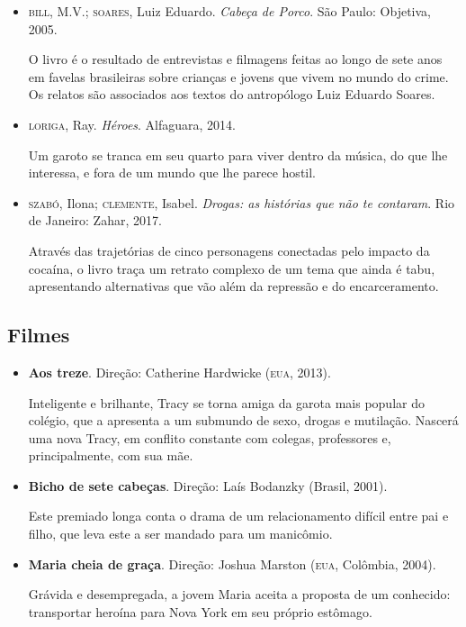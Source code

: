 \documentclass[11pt]{extarticle}
\begin{document}
\begin{itemize}
\item\textsc{bill}, M.V.; \textsc{soares}, Luiz Eduardo. \textit{Cabeça de Porco}. São Paulo: Objetiva, 2005.

O livro é o resultado de entrevistas e filmagens feitas ao longo de sete
anos em favelas brasileiras sobre crianças e jovens que vivem no mundo
do crime. Os relatos são associados aos textos do antropólogo Luiz
Eduardo Soares.

\item\textsc{loriga}, Ray. \textit{Héroes}. Alfaguara, 2014.

Um garoto se tranca em seu quarto para viver dentro da música, do que
lhe interessa, e fora de um mundo que lhe parece hostil.

\item\textsc{szabó}, Ilona; \textsc{clemente}, Isabel. \textit{Drogas: as histórias que não te contaram}. Rio de Janeiro: Zahar, 2017.

Através das trajetórias de cinco personagens conectadas pelo impacto da
cocaína, o livro traça um retrato complexo de um tema que ainda é tabu,
apresentando alternativas que vão além da repressão e do encarceramento.
\end{itemize}

\subsection{Filmes}

\begin{itemize}
\item\textbf{Aos treze}. Direção: Catherine Hardwicke (\textsc{eua}, 2013).

Inteligente e brilhante, Tracy se torna amiga da garota mais popular do
colégio, que a apresenta a um submundo de sexo, drogas e mutilação.
Nascerá uma nova Tracy, em conflito constante com colegas, professores
e, principalmente, com sua mãe.

\item\textbf{Bicho de sete cabeças}. Direção: Laís Bodanzky (Brasil, 2001).

Este premiado longa conta o drama de um relacionamento difícil entre pai
e filho, que leva este a ser mandado para um manicômio.

\item\textbf{Maria cheia de graça}. Direção: Joshua Marston (\textsc{eua}, Colômbia, 2004).

Grávida e desempregada, a jovem Maria aceita a proposta de um conhecido:
transportar heroína para Nova York em seu próprio estômago.
\end{itemize}
\end{document}
